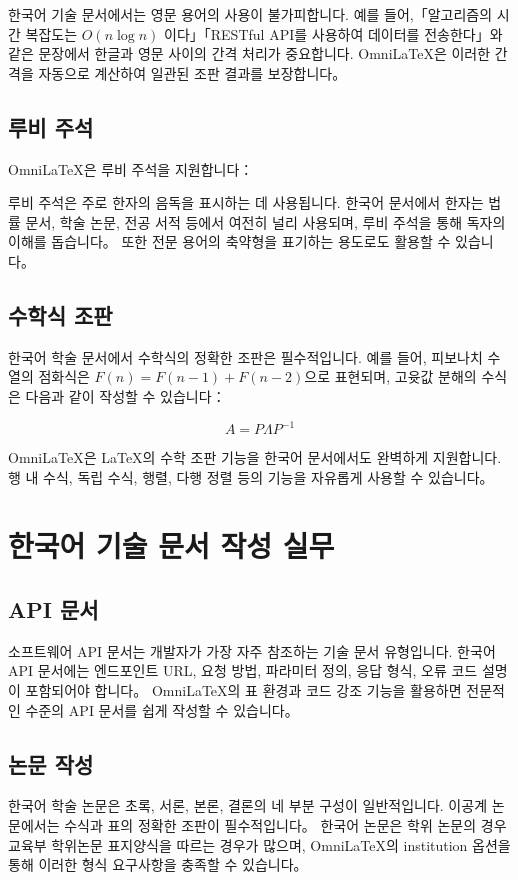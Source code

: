\documentclass[
    language=korean,
    doctype=article,
    institution=none,
]{../../omnilatex}
\begin{document}
한국어 기술 문서에서는 영문 용어의 사용이 불가피합니다. 예를 들어,「알고리즘의 시간 복잡도는 $O(n \log n)$ 이다」「RESTful API를 사용하여 데이터를 전송한다」와 같은 문장에서 한글과 영문 사이의 간격 처리가 중요합니다. OmniLaTeX은 이러한 간격을 자동으로 계산하여 일관된 조판 결과를 보장합니다。

\subsection{루비 주석}
OmniLaTeX은 루비 주석을 지원합니다：


루비 주석은 주로 한자의 음독을 표시하는 데 사용됩니다. 한국어 문서에서 한자는 법률 문서, 학술 논문, 전공 서적 등에서 여전히 널리 사용되며, 루비 주석을 통해 독자의 이해를 돕습니다。 또한 전문 용어의 축약형을 표기하는 용도로도 활용할 수 있습니다。

\subsection{수학식 조판}
한국어 학술 문서에서 수학식의 정확한 조판은 필수적입니다. 예를 들어, 피보나치 수열의 점화식은 $F(n) = F(n-1) + F(n-2)$으로 표현되며, 고윳값 분해의 수식은 다음과 같이 작성할 수 있습니다：

$$A = P \Lambda P^{-1}$$

OmniLaTeX은 \LaTeX{}의 수학 조판 기능을 한국어 문서에서도 완벽하게 지원합니다. 행 내 수식, 독립 수식, 행렬, 다행 정렬 등의 기능을 자유롭게 사용할 수 있습니다。

\section{한국어 기술 문서 작성 실무}

\subsection{API 문서}
소프트웨어 API 문서는 개발자가 가장 자주 참조하는 기술 문서 유형입니다. 한국어 API 문서에는 엔드포인트 URL, 요청 방법, 파라미터 정의, 응답 형식, 오류 코드 설명이 포함되어야 합니다。 OmniLaTeX의 표 환경과 코드 강조 기능을 활용하면 전문적인 수준의 API 문서를 쉽게 작성할 수 있습니다。

\subsection{논문 작성}
한국어 학술 논문은 초록, 서론, 본론, 결론의 네 부분 구성이 일반적입니다. 이공계 논문에서는 수식과 표의 정확한 조판이 필수적입니다。 한국어 논문은 학위 논문의 경우 교육부 학위논문 표지양식을 따르는 경우가 많으며, OmniLaTeX의 institution 옵션을 통해 이러한 형식 요구사항을 충족할 수 있습니다。
\end{document}
